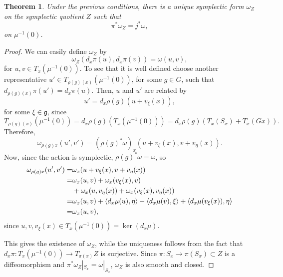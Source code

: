 \documentclass[12pt,a4paper]{book}
\newtheorem{thm}{Theorem}[section]
\theoremstyle{definition} \newtheorem{defn}[thm]{Definition}
\theoremstyle{definition} \newtheorem{ejemplo}[thm]{Example}
\theoremstyle{remark} \newtheorem*{rem}{Remark}
\def\gg{\mathfrak{g}}
\DeclarePairedDelimiter\esc{\langle}{\rangle}
\begin{document}
    \begin{thm}
      Under the previous conditions, there is a unique symplectic form $\omega_Z$ on the symplectic quotient $Z$ such that
      \begin{equation*}
	\pi^*\omega_Z=j^*\omega,
      \end{equation*}
      on $\mu^{-1}(0)$.
    \end{thm}

    \begin{proof}
      We can easily define $\omega_Z$ by
      \begin{equation*}
	\omega_Z(d_x\pi(u),d_x\pi(v))=\omega(u,v),
      \end{equation*}
      for $u,v \in T_x(\mu^{-1}(0))$. To see that it is well defined choose another representative $u'\in T_{\rho(g)(x)}(\mu^{-1}(0))$, for some $g\in G$, such that $d_{\rho(g)(x)}\pi(u')=d_x\pi(u)$. Then, $u$ and $u'$ are related by
      \begin{equation*}
	u'=d_x\rho(g) (u+v_{\xi}(x)),
      \end{equation*}
      for some $\xi \in \gg$, since $$T_{\rho(g)(x)}(\mu^{-1}(0))=d_x\rho(g)(T_x(\mu^{-1}(0)))=d_x\rho(g)(T_x(S_x)+T_x(Gx)).$$
      Therefore,
      \begin{equation*}
	\omega_{\rho(g)x}(u',v')=(\rho(g)^*\omega)_x(u+v_\xi(x),v+v_\eta(x)).
      \end{equation*}
      Now, since the action is symplectic, $\rho(g)^*\omega=\omega$, so
      \begin{align*}
	\omega_{\rho(g)x}(u',v')=&\omega_x(u+v_\xi(x),v+v_\eta(x)) \\
	=&\omega_x(u,v)+\omega_x(v_{\xi}(x),v) \\ &+\omega_x(u,v_\eta(x))+\omega_x(v_\xi(x),v_\eta(x)) \\
	=& \omega_x(u,v) + \esc{d_x\mu(u),\eta} - \esc{d_x\mu(v),\xi} + \esc{d_x\mu(v_\xi(x)),\eta} \\
	=& \omega_x(u,v),
      \end{align*}
      since $u, v, v_\xi(x) \in T_x(\mu^{-1}(0))=\ker(d_x\mu)$. 
      
      This gives the existence of $\omega_Z$, while the uniqueness follows from the fact that $d_x\pi:T_x(\mu^{-1}(0))\rightarrow T_{\pi(x)}Z$ is surjective. Since $\pi:S_x \rightarrow \pi(S_x)\subset Z$ is a diffeomorphism and $\pi^*\omega_Z|_{S_x}=\omega|_{S_x}$, $\omega_Z$ is also smooth and closed. 


\end{proof}
\end{document}
